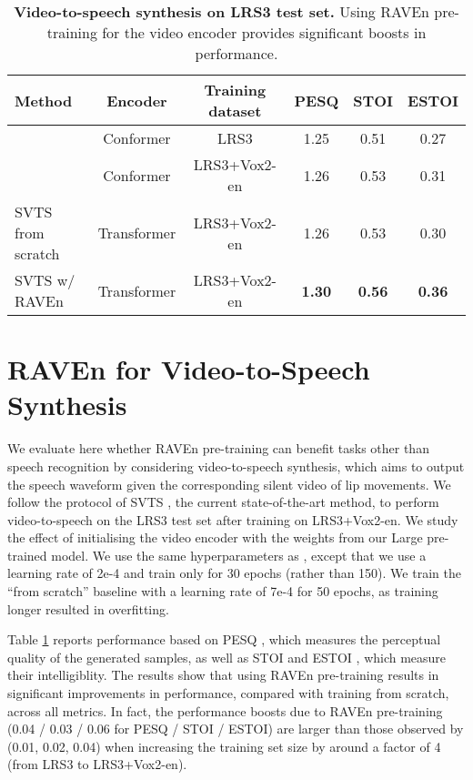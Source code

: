 \documentclass{article} \usepackage{iclr2023_conference,times}
\begin{document}
\begin{table}
\centering
\begin{tabular}[b]{l c c | c c c}\toprule
Method & Encoder & Training dataset & PESQ & STOI & ESTOI \\
\midrule
\citet{mira2022svts} & Conformer & LRS3 & 1.25 & 0.51 & 0.27 \\
\citet{mira2022svts} & Conformer & LRS3+Vox2-en & 1.26 & 0.53 & 0.31 \\
SVTS from scratch & Transformer & LRS3+Vox2-en & 1.26 & 0.53 & 0.30 \\
\rowcolor{LightCyan}
SVTS w/ RAVEn & Transformer & LRS3+Vox2-en & \textbf{1.30} & \textbf{0.56} & \textbf{0.36} \\
\bottomrule 
\end{tabular}
\caption{\textbf{Video-to-speech synthesis on LRS3 test set.} Using RAVEn pre-training for the video encoder provides significant boosts in performance.}
\label{table:video2speech}
\end{table}

\section{RAVEn for Video-to-Speech Synthesis}
We evaluate here whether RAVEn pre-training can benefit tasks other than speech recognition by considering video-to-speech synthesis, which aims to output the speech waveform given the corresponding silent video of lip movements. We follow the protocol of SVTS \citep{mira2022svts}, the current state-of-the-art method, to perform video-to-speech on the LRS3 test set after training on LRS3+Vox2-en. We study the effect of initialising the video encoder with the weights from our Large pre-trained model. We use the same hyperparameters as \citet{mira2022svts}, except that we use a learning rate of 2e-4 and train only for 30 epochs (rather than 150). We train the ``from scratch'' baseline with a learning rate of 7e-4 for 50 epochs, as training longer resulted in overfitting.

Table \ref{table:video2speech} reports performance based on PESQ \citep{rix2001perceptual}, which measures the perceptual quality of the generated samples, as well as STOI and ESTOI \citep{taal2011algorithm}, which measure their intelligiblity. The results show that using RAVEn pre-training results in significant improvements in performance, compared with training from scratch, across all metrics. In fact, the performance boosts due to RAVEn pre-training (0.04 / 0.03 / 0.06 for PESQ / STOI / ESTOI) are larger than those observed by \citet{mira2022svts} (0.01, 0.02, 0.04) when increasing the training set size by around a factor of 4 (from LRS3 to LRS3+Vox2-en).
\end{document}
